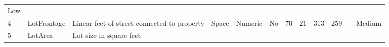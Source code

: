 \documentclass[11pt]{article}
\begin{document}
\begin{longtable}[]{@{}llllllllllll@{}}
\begin{minipage}[t]{0.04\columnwidth}
Low\strut
\end{minipage}\tabularnewline
\begin{minipage}[t]{0.04\columnwidth}\raggedright\strut
4\strut
\end{minipage} & \begin{minipage}[t]{0.04\columnwidth}\raggedright\strut
LotFrontage\strut
\end{minipage} & \begin{minipage}[t]{0.04\columnwidth}\raggedright\strut
Linear feet of street connected to property\strut
\end{minipage} & \begin{minipage}[t]{0.04\columnwidth}\raggedright\strut
Space\strut
\end{minipage} & \begin{minipage}[t]{0.04\columnwidth}\raggedright\strut
Numeric\strut
\end{minipage} & \begin{minipage}[t]{0.04\columnwidth}\raggedright\strut
No\strut
\end{minipage} & \begin{minipage}[t]{0.04\columnwidth}\raggedright\strut
70\strut
\end{minipage} & \begin{minipage}[t]{0.04\columnwidth}\raggedright\strut
21\strut
\end{minipage} & \begin{minipage}[t]{0.04\columnwidth}\raggedright\strut
313\strut
\end{minipage} & \begin{minipage}[t]{0.04\columnwidth}\raggedright\strut
259\strut
\end{minipage} & \begin{minipage}[t]{0.04\columnwidth}\raggedright\strut
\strut
\end{minipage} & \begin{minipage}[t]{0.04\columnwidth}\raggedright\strut
Medium\strut
\end{minipage}\tabularnewline
\begin{minipage}[t]{0.04\columnwidth}\raggedright\strut
5\strut
\end{minipage} & \begin{minipage}[t]{0.04\columnwidth}\raggedright\strut
LotArea\strut
\end{minipage} & \begin{minipage}[t]{0.04\columnwidth}\raggedright\strut
Lot size in square feet\strut
\end{minipage} & \begin{minipage}[t]{0.04\columnwidth}\raggedright\strut

\end{minipage}
\end{longtable}
\end{document}
